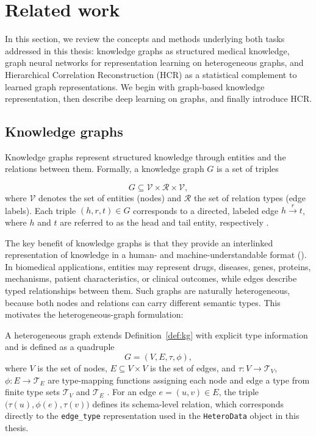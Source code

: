 \newpage %
\section{Related work}

In this section, we review the concepts and methods underlying both tasks
addressed in this thesis: knowledge graphs as structured medical knowledge,
graph neural networks for representation learning on heterogeneous graphs,
and Hierarchical Correlation Reconstruction (HCR) as a statistical complement
to learned graph representations.
We begin with graph-based knowledge representation, then describe deep
learning on graphs, and finally introduce HCR.

\subsection{Knowledge graphs}
\label{subsec:related-kg}

Knowledge graphs represent structured knowledge through entities and the
relations between them.
Formally, a knowledge graph $G$ is a set of triples

\begin{definition}
\label{def:kg}
$$G \subseteq \mathcal{V} \times \mathcal{R} \times \mathcal{V},$$
where $\mathcal{V}$ denotes the set of entities (nodes) and $\mathcal{R}$
the set of relation types (edge labels). Each triple $(h, r, t) \in G$
corresponds to a directed, labeled edge $h \xrightarrow{r} t$, where $h$
and $t$ are referred to as the head and tail entity, respectively
\textcite{hogan2021knowledge}.
\end{definition}

The key benefit of knowledge graphs is that they provide an interlinked
representation of knowledge in a human- and machine-understandable format
(\textcite{barrasa2023building}).
In biomedical applications, entities may represent drugs, diseases, genes,
proteins, mechanisms, patient characteristics, or clinical outcomes, while
edges describe typed relationships between them.
Such graphs are naturally heterogeneous, because both nodes 
and relations can carry different semantic types.
This motivates the heterogeneous-graph formulation:

\begin{definition}
\label{def:heterokg}
A heterogeneous graph extends Definition~\ref{def:kg} with explicit type
information and is defined as a quadruple
$$G = (V, E, \tau, \phi),$$
where $V$ is the set of nodes, $E \subseteq V \times V$ is the set of
edges, and $\tau: V \rightarrow \mathcal{T}_V$, $\phi: E \rightarrow
\mathcal{T}_E$ are type-mapping functions assigning each node and edge a
type from finite type sets $\mathcal{T}_V$ and $\mathcal{T}_E$
\cite{hu2020heterogeneous}. For an edge $e = (u, v) \in E$, the triple
$\bigl(\tau(u), \phi(e), \tau(v)\bigr)$ defines its schema-level relation,
which corresponds directly to the \texttt{edge\_type} representation used
in the \texttt{HeteroData} object in this thesis.
\end{definition}

